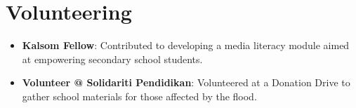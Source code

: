 \documentclass[letterpaper,11pt]{article}
\newcommand{\resumeItem}[2]{
  \item\small{
    \textbf{#1}{: #2 \vspace{-2pt}}
  }
}
\newcommand{\resumeSubItem}[2]{\resumeItem{#1}{#2}\vspace{-4pt}}
\newcommand{\resumeSubHeadingListStart}{\begin{itemize}[leftmargin=*]}
\newcommand{\resumeSubHeadingListEnd}{\end{itemize}}
\begin{document}

\section{Volunteering}
  \resumeSubHeadingListStart
    \resumeSubItem{Kalsom Fellow}
      {Contributed to developing a media literacy module aimed at empowering secondary school students.}
    \resumeSubItem{Volunteer @ Solidariti Pendidikan}
      {Volunteered at a Donation Drive to gather  school materials for those affected by the flood.}
    \resumeSubHeadingListEnd
\end{document}
